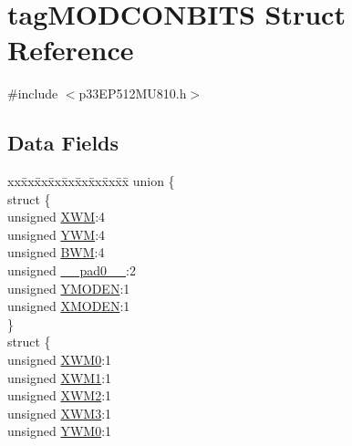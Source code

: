 \hypertarget{structtag_m_o_d_c_o_n_b_i_t_s}{}\section{tag\+M\+O\+D\+C\+O\+N\+B\+I\+TS Struct Reference}
\label{structtag_m_o_d_c_o_n_b_i_t_s}


{\ttfamily \#include $<$p33\+E\+P512\+M\+U810.\+h$>$}

\subsection*{Data Fields}
\begin{DoxyCompactItemize}
\item 
\begin{tabbing}
xx\=xx\=xx\=xx\=xx\=xx\=xx\=xx\=xx\=\kill
union \{\\
\>struct \{\\
\>\>unsigned \hyperlink{structtag_m_o_d_c_o_n_b_i_t_s_a082fcef870088ea8c113f1bc4da6d6dd}{XWM}:4\\
\>\>unsigned \hyperlink{structtag_m_o_d_c_o_n_b_i_t_s_a731c9e2ff7553f9d6e51ef41cc36cb1a}{YWM}:4\\
\>\>unsigned \hyperlink{structtag_m_o_d_c_o_n_b_i_t_s_a9c2dcb8396e69125190826059ee40e8a}{BWM}:4\\
\>\>unsigned \hyperlink{structtag_m_o_d_c_o_n_b_i_t_s_adf71f3d8410c1f1dbbc96680a92c49af}{\_\_pad0\_\_}:2\\
\>\>unsigned \hyperlink{structtag_m_o_d_c_o_n_b_i_t_s_a642cc9f508992fcaf8172d9644797eb3}{YMODEN}:1\\
\>\>unsigned \hyperlink{structtag_m_o_d_c_o_n_b_i_t_s_aa5a77a5715fcacf19ef1de23382f5b9e}{XMODEN}:1\\
\>\} \\
\>struct \{\\
\>\>unsigned \hyperlink{structtag_m_o_d_c_o_n_b_i_t_s_a35879f77ef9ee60d2cf529fdaa2efd0b}{XWM0}:1\\
\>\>unsigned \hyperlink{structtag_m_o_d_c_o_n_b_i_t_s_a6d7c08b4a1c79bc61131267a45d5a8d6}{XWM1}:1\\
\>\>unsigned \hyperlink{structtag_m_o_d_c_o_n_b_i_t_s_a4642c2c2d0a1bd58c0fa0807258d3e8e}{XWM2}:1\\
\>\>unsigned \hyperlink{structtag_m_o_d_c_o_n_b_i_t_s_a88bf725e2055199850e9fc21a28e539d}{XWM3}:1\\
\>\>unsigned \hyperlink{structtag_m_o_d_c_o_n_b_i_t_s_a4916f85d240f3267f2908545e73fd57b}{YWM0}:1\\

\end{tabbing}
\end{DoxyCompactItemize}
